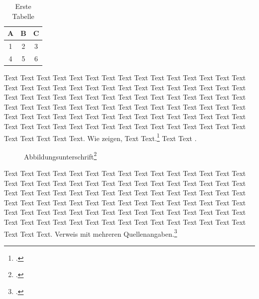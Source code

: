 \begin{table}[tb]
    \centering
    \begin{tabular}{ccc}
        \toprule
        A & B & C \\
        \midrule
        1 & 2 & 3 \\
        4 & 5 & 6 \\
        \bottomrule
    \end{tabular}
    \caption{Erste Tabelle}\label{tab:1}
\end{table}
Text Text Text Text Text Text Text Text Text Text Text Text Text Text Text Text Text Text Text Text Text Text Text Text Text Text Text Text Text Text Text Text Text Text Text Text Text Text Text Text Text Text Text  Text Text Text Text Text Text Text Text Text Text Text Text Text Text Text Text Text Text Text Text Text Text Text Text Text Text Text Text Text Text Text Text Text Text Text Text Text Text Text Text Text Text Text Text Text Text Text Text Text Text Text Text. Wie \citeauthor{HinzH1:2009} zeigen, Text Text.\footcite[Vgl.][33]{HinzH1:2009} Text Text .

\begin{figure}[h]
    \centering
    \caption[Abbildungsunterschrift]{Abbildungsunterschrift\footcite[Vgl.][39]{HinzH1:2009}}
\end{figure}

Text Text Text Text Text Text Text Text Text Text Text Text Text Text Text Text Text Text Text Text Text Text Text Text Text Text Text Text Text Text Text Text Text Text Text Text Text Text Text Text Text Text Text Text Text Text Text Text Text Text Text Text Text Text Text Text Text Text Text Text Text Text Text Text Text Text Text Text Text Text Text Text Text Text Text Text Text Text Text Text Text Text Text Text Text Text Text Text Text Text Text Text Text. Verweis mit mehreren Quellenangaben.\footcites(Vgl.)()[][24]{HinzH1:2009}[][15]{KunzK1:2010}
